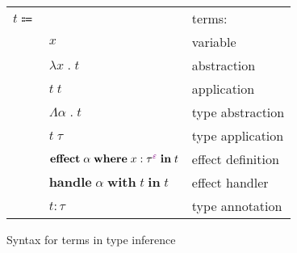 \documentclass[12pt]{article}
\newcommand\anno[2]{#1 : #2}
\newcommand\term{t}
\newcommand\eVar{x}
\newcommand\eAbs[2]{\lambda #1 \; . \; #2}
\newcommand\eApp[2]{#1 \; #2}
\newcommand\eTAbs[2]{\Lambda #1 \; . \; #2}
\newcommand\eTApp[2]{#1 \; #2}
\newcommand\eHandle[3]{\textbf{handle} \; #1 \; \textbf{with} \; #2 \; \textbf{in} \; #3}
\newcommand\eEffect[5]{\textbf{effect} \; #1 \; \textbf{where} \; \anno{#2}{\tEmbellished{#3}{#4}} \; \textbf{in} \; #5}
\newcommand\eAnno[2]{\anno{#1}{#2}}
\newcommand\type{\tau}
\newcommand\tVar{\alpha}
\newcommand\tEmbellished[2]{{#1}^{\textcolor{violet}{#2}}}
\newcommand\row{\varepsilon}
\begin{document}
      \begin{figure}[H]
        \begin{mdframed}[backgroundcolor=none]
          \begin{center}
            \begin{tabular}{l l l}
              $\term \Coloneqq$ & & terms: \\
              & $\eVar$ & variable \\
              & $\eAbs{\eVar}{\term}$ & abstraction \\
              & $\eApp{\term}{\term}$ & application \\
              & $\eTAbs{\tVar}{\term}$ & type abstraction \\
              & $\eTApp{\term}{\type}$ & type application \\
              & $\eEffect{\tVar}{\eVar}{\type}{\row}{\term}$ & effect definition \\
              & $\eHandle{\tVar}{\term}{\term}$ & effect handler \\
              & $\eAnno{\term}{\type}$ & type annotation \\
            \end{tabular}
          \end{center}

          \caption{Syntax for terms in type inference}\label{fig:syntax_inference}
        \end{mdframed}
      \end{figure}
\end{document}
